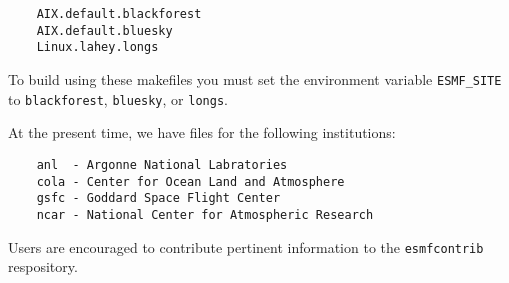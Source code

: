 \begin{verbatim}
	AIX.default.blackforest
	AIX.default.bluesky
	Linux.lahey.longs
\end{verbatim}

To build using these makefiles you must set the environment 
variable {\tt ESMF\_SITE} to {\tt blackforest}, {\tt bluesky}, or {\tt longs}.

At the present time, we have files for the following institutions:

\begin{verbatim}
	anl  - Argonne National Labratories
	cola - Center for Ocean Land and Atmosphere
	gsfc - Goddard Space Flight Center
	ncar - National Center for Atmospheric Research
\end{verbatim}


Users are encouraged to contribute pertinent information to the 
{\tt esmfcontrib} respository.




